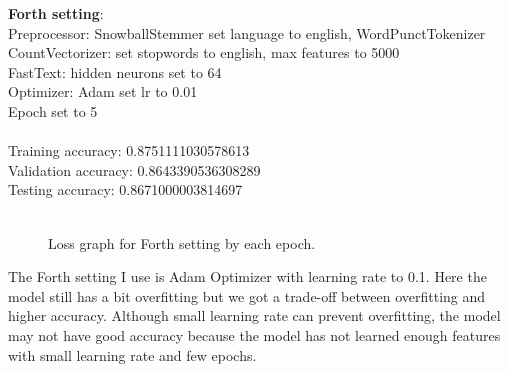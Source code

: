\documentclass{article} %
\begin{document}
\noindent
\textbf{Forth setting}:\\
Preprocessor: SnowballStemmer set language to english, WordPunctTokenizer\\
CountVectorizer: set stopwords to english, max features to 5000\\
FastText: hidden neurons set to 64\\
Optimizer: Adam set lr to 0.01\\
Epoch set to 5\\
\\
\noindent
Training accuracy: 0.8751111030578613\\
Validation accuracy: 0.8643390536308289\\
Testing accuracy: 0.8671000003814697\\
\begin{figure}[htp]
    \centering
    \\
Loss graph for Forth setting by each epoch.   
    \end{figure}
The Forth setting I use is Adam Optimizer with learning rate to 0.1. Here the model still has a bit overfitting but we got a trade-off between overfitting and 
higher accuracy. Although small learning rate can prevent overfitting, the model may not have good accuracy because the model has not learned enough features with small learning rate and few epochs.
\end{document}

